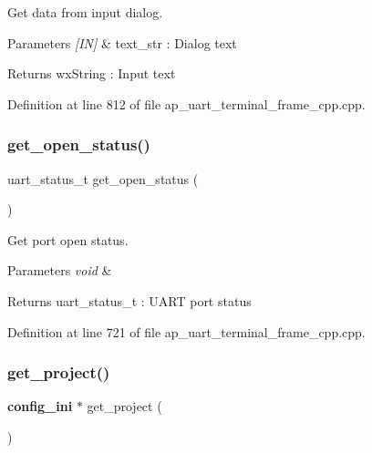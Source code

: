 Get data from input dialog. 


\begin{DoxyParams}{Parameters}
{\em \mbox{[}\+I\+N\mbox{]}} & text\+\_\+str \+: Dialog text \\
\hline
\end{DoxyParams}
\begin{DoxyReturn}{Returns}
wx\+String \+: Input text 
\end{DoxyReturn}


Definition at line 812 of file ap\+\_\+uart\+\_\+terminal\+\_\+frame\+\_\+cpp.\+cpp.

\mbox{\label{group___u_a_r_t__terminal_ga4290ac6ba3f3672d077625fbd079dd9f}} 
\subsubsection{get\_open\_status()}
{\footnotesize\ttfamily uart\+\_\+status\+\_\+t get\+\_\+open\+\_\+status (\begin{DoxyParamCaption}\item[{void}]{ }\end{DoxyParamCaption})}



Get port open status. 


\begin{DoxyParams}{Parameters}
{\em void} & \\
\hline
\end{DoxyParams}
\begin{DoxyReturn}{Returns}
uart\+\_\+status\+\_\+t \+: U\+A\+RT port status 
\end{DoxyReturn}


Definition at line 721 of file ap\+\_\+uart\+\_\+terminal\+\_\+frame\+\_\+cpp.\+cpp.

\mbox{\label{group___u_a_r_t__terminal_gadb467188cf8181ac20594cef5f000774}} 
\subsubsection{get\_project()}
{\footnotesize\ttfamily \textbf{ config\+\_\+ini} $\ast$ get\+\_\+project (\begin{DoxyParamCaption}\item[{void}]{ }\end{DoxyParamCaption})}



